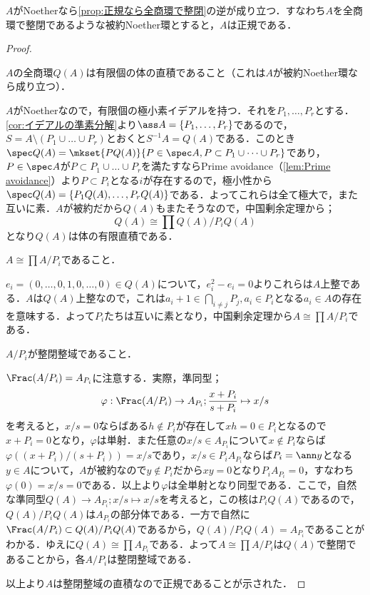 \begin{thm}
	$A$がNoetherなら\ref{prop:正規なら全商環で整閉}の逆が成り立つ．すなわち$A$を全商環で整閉であるような被約Noether環とすると，$A$は正規である．
\end{thm}

\begin{proof}
	\begin{step}
		\item $A$の全商環$Q(A)$は有限個の体の直積であること（これは$A$が被約Noether環なら成り立つ）．
		
		$A$がNoetherなので，有限個の極小素イデアルを持つ．それを$P_1,\dots,P_r$とする．\ref{cor:イデアルの準素分解}より$\ass A=\{P_1,\dots,P_r\}$であるので，$S=A\setminus(P_1\cup\dots\cup P_r)$とおくと$S^{-1}A=Q(A)$である．このとき$\spec Q(A)=\mkset{PQ(A)}{P\in\spec A,P\subset P_1\cup\dots\cup P_r}$であり，$P\in\spec A$が$P\subset P_1\cup\dots\cup P_r$を満たすならPrime avoidance（\ref{lem:Prime avoidance}）より$P\subset P_i$となる$i$が存在するので，極小性から$\spec Q(A)=\{P_1Q(A),\dots,P_rQ(A)\}$である．よってこれらは全て極大で，また互いに素．$A$が被約だから$Q(A)$もまたそうなので，中国剰余定理から；
		\[Q(A)\cong\prod Q(A)/P_iQ(A)\]
		となり$Q(A)$は体の有限直積である．
		
		\item $A\cong\prod A/P_i$であること．
		
		$e_i=(0,\dots,0,1,0,\dots,0)\in Q(A)$について，$e_i^2-e_i=0$よりこれらは$A$上整である．$A$は$Q(A)$上整なので，これは$a_i+1\in\bigcap_{i\neq j}P_j,a_i\in P_i$となる$a_i\in A$の存在を意味する．よって$P_i$たちは互いに素となり，中国剰余定理から$A\cong\prod A/P_i$である．
		
		\item $A/P_i$が整閉整域であること．
		
		$\Frac(A/P_i)=A_{P_i}$に注意する．実際，準同型；
		\[\varphi:\Frac(A/P_i)\to A_{P_i};\frac{x+P_i}{s+P_i}\mapsto x/s\]
		を考えると，$x/s=0$ならばある$h\not\in P_i$が存在して$xh=0\in P_i$となるので$x+P_i=0$となり，$\varphi$は単射．また任意の$x/s\in A_{P_i}$について$x\not\in P_i$ならば$\varphi((x+P_i)/(s+P_i))=x/s$であり，$x/s\in P_iA_{P_i}$ならば$P_i=\ann y$となる$y\in A$について，$A$が被約なので$y\not\in P_i$だから$xy=0$となり$P_iA_{P_i}=0$，すなわち$\varphi(0)=x/s=0$である．以上より$\varphi$は全単射となり同型である．ここで，自然な準同型$Q(A)\to A_{P_i};x/s\mapsto x/s$を考えると，この核は$P_iQ(A)$であるので，$Q(A)/P_iQ(A)$は$A_{P_i}$の部分体である．一方で自然に$\Frac(A/P_i)\subset Q(A)/P_iQ(A)$であるから，$Q(A)/P_iQ(A)=A_{P_i}$であることがわかる．ゆえに$Q(A)\cong\prod A_{P_i}$である．よって$A\cong\prod A/P_i$は$Q(A)$で整閉であることから，各$A/P_i$は整閉整域である．
	\end{step}
	以上より$A$は整閉整域の直積なので正規であることが示された．
\end{proof}
